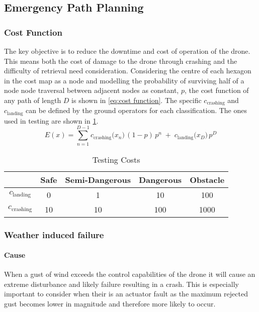 \subsection{Emergency Path Planning}\label{sub_section:tgt_path_planning}

\subsubsection{Cost Function}\label{sub_sub_section:tgt_cost_function}
The key objective is to reduce the downtime and cost of operation of the drone. This means both the cost of damage to the drone through crashing and the difficulty of retrieval need consideration. Considering the centre of each hexagon in the cost map as a node and modelling the probability of surviving half of a node node traversal between adjacent nodes as constant, $p$, the cost function of any path of length $D$ is shown in \ref{eq:cost function}. The specific $c_{\text{crashing}}$ and $c_{\text{landing}}$ can be defined by the ground operators for each classification. The ones used in testing are shown in \ref{tab:cost_values}.
\begin{equation}\label{eq:cost function}
    E(x) 
    = \sum_{n=1}^{D-1} c_{\text{crashing}}\bigl(x_n\bigr)\, (1-p) \,p^n 
    \;+\; c_{\text{landing}}\bigl(x_D\bigr)\, p^D
\end{equation}
\begin{table}[h]
    \centering
    \begin{tabular}{|c|c|c|c|c|}
    \hline
         \textbf{} & \textbf{Safe} & \textbf{Semi-Dangerous} & \textbf{Dangerous} & \textbf{Obstacle} \\
         \hline
         $c_{\text{landing}}$ & 0 & 1 & 10 & 100 \\
         $c_{\text{crashing}}$ & 10 & 10 & 100 & 1000\\
         \hline
    \end{tabular}
    \caption{Testing Costs}
    \label{tab:cost_values}
\end{table}

\subsubsection{Weather induced failure}\label{sub_sub_section:tgt_weather_failure}
\paragraph{Cause}
When a gust of wind exceeds the control capabilities of the drone it will cause an extreme disturbance and likely failure resulting in a crash. This is especially important to consider when their is an actuator fault as the maximum rejected gust becomes lower in magnitude and therefore more likely to occur.
